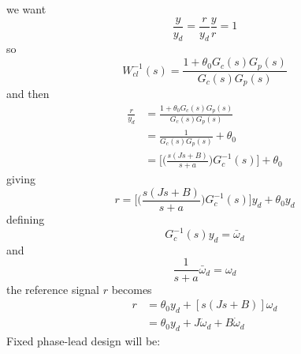 we want
\begin{equation*}
  \frac{y}{y_{d}}=\frac{r}{y_{d}}\frac{y}{r}=1
\end{equation*}
so
\begin{equation*}
  W_{cl}^{-1}(s)=\frac{1+\theta_{0}G_{c}(s)G_{p}(s)}{G_{c}(s)G_{p}(s)}
\end{equation*}
and then
\begin{align*}
  \frac{r}{y_{d}}&=\frac{1+\theta_{0}G_{c}(s)G_{p}(s)}{G_{c}(s)G_{p}(s)} \\
  &=\frac{1}{G_{c}(s)G_{p}(s)}+\theta_{0} \\
  &=\biggr[\biggr(\frac{s(Js+B)}{s+a}\biggr)G_{c}^{-1}(s)\biggr]+\theta_{0}
\end{align*}
giving
\begin{equation*}
  r=\biggr[\biggr(\frac{s(Js+B)}{s+a}\biggr)G_{c}^{-1}(s)\biggr]y_{d}+\theta_{0}y_{d}
\end{equation*}
defining
\begin{equation*}
  G_{c}^{-1}(s)y_{d}=\bar{\omega}_{d}
\end{equation*}
and
\begin{equation*}
  \frac{1}{s+a}\bar{\omega}_{d}=\omega_{d}
\end{equation*}
the reference signal $r$ becomes
\begin{align*}
  r&=\theta_{0}y_{d}+[s(Js+B)]\omega_{d} \\
  &=\theta_{0}y_{d}+J\ddot{\omega}_{d}+B\dot{\omega}_{d}
\end{align*}
Fixed phase-lead design will be:


